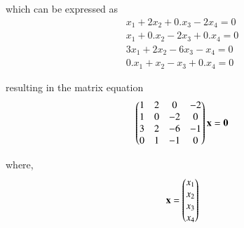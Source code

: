 \documentclass[journal,12pt,twocolumn]{IEEEtran}
\begin{document}
which can be expressed as
\begin{align}
    x_{1}+ 2x_{2}+ 0.x_{3} -2x_{4} = 0\\
    x_{1}+ 0.x_{2} -2x_{3} +0.x_{4}= 0\\
    3x_{1}+ 2x_{2}-6x_{3}- x_{4} =0\\
    0.x_{1} +x_{2}-x_{3} +0.x_{4}= 0
\end{align}

resulting in the matrix equation
\begin{align}
    \label{eq: matrix}
    \begin{pmatrix}1 & 2 & 0 & -2\\
           1 & 0 & -2 & 0\\
           3 & 2 & -6 & -1\\
           0 & 1 & -1 & 0\end{pmatrix}\mathbf{x}
           =\mathbf{0}
\end{align}

where,
\begin{align}
   \mathbf{x}= \begin{pmatrix}x_{1}\\x_{2}\\x_{3}\\x_{4}\end{pmatrix}
\end{align}
\end{document}
